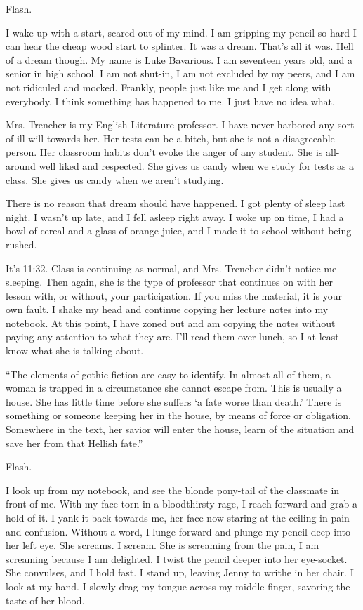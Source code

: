 Flash.

I wake up with a start, scared out of my mind. I am gripping my
pencil so hard I can hear the cheap wood start to splinter. It was
a dream. That's all it was. Hell of a dream though. My name
is Luke Bavarious. I am seventeen years old, and a senior in high
school. I am not shut-in, I am not excluded by my peers, and I am
not ridiculed and mocked. Frankly, people just like me and I get
along with everybody. I think something has happened to me. I just
have no idea what.

Mrs. Trencher is my English Literature professor. I have never
harbored any sort of ill-will towards her. Her tests can be a
bitch, but she is not a disagreeable person. Her classroom habits
don't evoke the anger of any student. She is all-around well
liked and respected. She gives us candy when we study for tests as
a class. She gives us candy when we aren't studying.

There is no reason that dream should have happened. I got plenty of
sleep last night. I wasn't up late, and I fell asleep right
away. I woke up on time, I had a bowl of cereal and a glass of
orange juice, and I made it to school without being rushed.

It's 11:32. Class is continuing as normal, and Mrs. Trencher
didn't notice me sleeping. Then again, she is the type of
professor that continues on with her lesson with, or without, your
participation. If you miss the material, it is your own fault. I
shake my head and continue copying her lecture notes into my
notebook. At this point, I have zoned out and am copying the notes
without paying any attention to what they are. I'll read them
over lunch, so I at least know what she is talking about.

``The elements of gothic fiction are easy to identify. In
almost all of them, a woman is trapped in a circumstance she cannot
escape from. This is usually a house. She has little time before
she suffers `a fate worse than death.' There is
something or someone keeping her in the house, by means of force or
obligation. Somewhere in the text, her savior will enter the house,
learn of the situation and save her from that Hellish
fate.''



Flash.



I look up from my notebook, and see the blonde pony-tail of the
classmate in front of me. With my face torn in a bloodthirsty rage,
I reach forward and grab a hold of it. I yank it back towards me,
her face now staring at the ceiling in pain and confusion. Without
a word, I lunge forward and plunge my pencil deep into her left
eye. She screams. I scream. She is screaming from the pain, I am
screaming because I am delighted. I twist the pencil deeper into
her eye-socket. She convulses, and I hold fast. I stand up, leaving
Jenny to writhe in her chair. I look at my hand. I slowly drag my
tongue across my middle finger, savoring the taste of her
blood.

